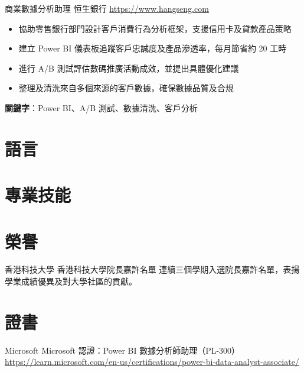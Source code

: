 \documentclass[a4paper, serif, 10pt]{moderncv}
\begin{document}
        {商業數據分析助理}
        {恒生銀行}
        {\url{https://www.hangseng.com}}
        {}
        {\begin{itemize}
\item 協助零售銀行部門設計客戶消費行為分析框架，支援信用卡及貸款產品策略
\item 建立 Power BI 儀表板追蹤客戶忠誠度及產品滲透率，每月節省約 20 工時
\item 進行 A/B 測試評估數碼推廣活動成效，並提出具體優化建議
\item 整理及清洗來自多個來源的客戶數據，確保數據品質及合規
\end{itemize}
\textbf{關鍵字}：Power BI、A/B 測試、數據清洗、客戶分析}
\section{語言}

\section{專業技能}

\section{榮譽}

        {香港科技大學}
        {香港科技大學院長嘉許名單}
        {}
        {}
        {連續三個學期入選院長嘉許名單，表揚學業成績優異及對大學社區的貢獻。}
\section{證書}

        {Microsoft}
        {Microsoft 認證：Power BI 數據分析師助理（PL-300）}
        {\url{https://learn.microsoft.com/en-us/certifications/power-bi-data-analyst-associate/}}
        {}
        {}
\end{document}
